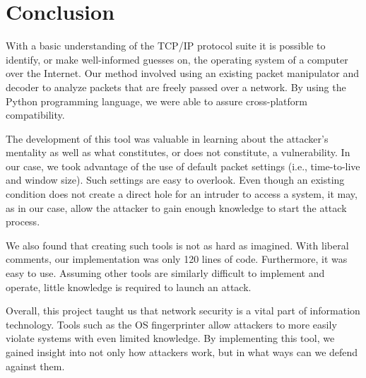 \section{Conclusion}

With a basic understanding of the TCP/IP protocol suite it is possible to identify, or make well-informed guesses on, the operating system of a computer over the Internet. Our method involved using an existing packet manipulator and decoder to analyze packets that are freely passed over a network. By using the Python programming language, we were able to assure cross-platform compatibility.

The development of this tool was valuable in learning about the attacker's mentality as well as what constitutes, or does not constitute, a vulnerability. In our case, we took advantage of the use of default packet settings (i.e., time-to-live and window size). Such settings are easy to overlook. Even though an existing condition does not create a direct hole for an intruder to access a system, it may, as in our case, allow the attacker to gain enough knowledge to start the attack process.

We also found that creating such tools is not as hard as imagined. With liberal comments, our implementation was only 120 lines of code. Furthermore, it was easy to use. Assuming other tools are similarly difficult to implement and operate, little knowledge is required to launch an attack.

Overall, this project taught us that network security is a vital part of information technology. Tools such as the OS fingerprinter allow attackers to more easily violate systems with even limited knowledge. By implementing this tool, we gained insight into not only how attackers work, but in what ways can we defend against them.